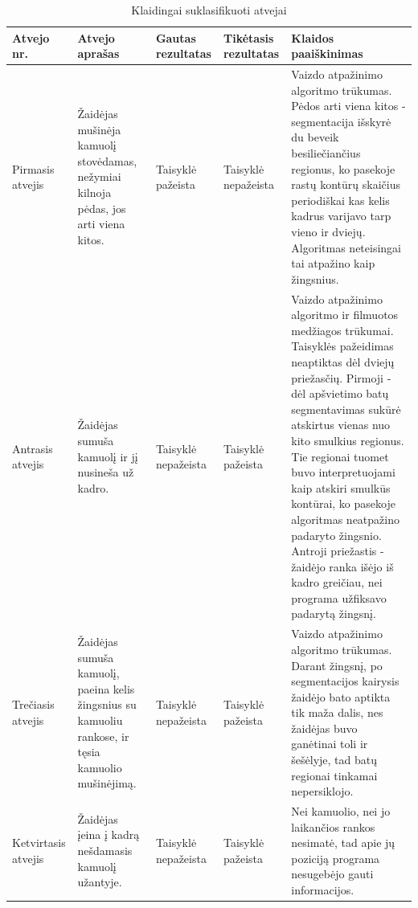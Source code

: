 \documentclass{VUMIFPSkursinis}
\begin{document}
\begin{table}[H]\footnotesize
	\centering
	\caption{Klaidingai suklasifikuoti atvejai}
	\begin{tabular}{|p{2cm}|p{3cm}|p{2cm}|p{2cm}|p{6cm}|}  \hline
		\textbf{Atvejo nr.} & \textbf{Atvejo aprašas} & \textbf{Gautas rezultatas} &     \textbf{Tikėtasis rezultatas} & \textbf{Klaidos paaiškinimas} \\
		
		\hline
		Pirmasis atvejis    & Žaidėjas mušinėja kamuolį stovėdamas, nežymiai kilnoja pėdas, jos arti viena kitos.                & Taisyklė pažeista   & Taisyklė nepažeista & Vaizdo atpažinimo algoritmo trūkumas. Pėdos arti viena kitos - segmentacija išskyrė du beveik besiliečiančius regionus, ko pasekoje rastų kontūrų skaičius periodiškai kas kelis kadrus varijavo tarp vieno ir dviejų. Algoritmas neteisingai tai atpažino kaip žingsnius.                                                                                                                                                                                                                      \\ \hline
		Antrasis atvejis    & Žaidėjas sumuša kamuolį ir jį nusineša už kadro.                                                   & Taisyklė nepažeista & Taisyklė pažeista   & Vaizdo atpažinimo algoritmo ir filmuotos medžiagos trūkumai. Taisyklės pažeidimas neaptiktas dėl dviejų priežasčių. Pirmoji - dėl apšvietimo batų segmentavimas sukūrė atskirtus vienas nuo kito smulkius regionus. Tie regionai tuomet buvo interpretuojami kaip atskiri smulkūs kontūrai, ko pasekoje algoritmas neatpažino padaryto žingsnio. Antroji priežastis - žaidėjo ranka išėjo iš kadro greičiau, nei programa užfiksavo padarytą žingsnį. \\ \hline
		Trečiasis atvejis   & Žaidėjas sumuša kamuolį, paeina kelis žingsnius su kamuoliu rankose, ir tęsia kamuolio mušinėjimą. & Taisyklė nepažeista & Taisyklė pažeista   & Vaizdo atpažinimo algoritmo trūkumas. Darant žingsnį, po segmentacijos kairysis žaidėjo bato aptikta tik maža dalis, nes žaidėjas buvo ganėtinai toli ir šešėlyje, tad batų regionai tinkamai nepersiklojo.                                                                                                                                                                                                                                                                                     \\ \hline
		Ketvirtasis atvejis & Žaidėjas įeina į kadrą nešdamasis kamuolį užantyje.                                                & Taisyklė nepažeista & Taisyklė pažeista   & Nei kamuolio, nei jo laikančios rankos nesimatė, tad apie jų poziciją programa nesugebėjo gauti informacijos.                                                                                                                                                                                                                                                                                                                                                                                   \\ \hline
	\end{tabular}
	\label{tab:table example}
\end{table}
\end{document}
